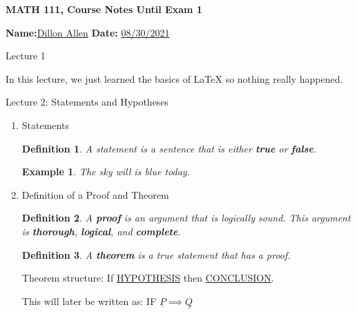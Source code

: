 \documentclass[11pt]{amsart}
\newtheorem{definition}{Definition}
\newtheorem{example}{Example}
\begin{document}
\begin{center}
\textbf{MATH 111, Course Notes Until Exam 1}%
\end{center}

\vspace{.3 in}

\textbf{Name:}\underline{Dillon Allen} \hspace{1in} \textbf{Date:} \underline{08/30/2021}%

\vspace{.3in}



\begin{section}{Lecture 1}

In this lecture, we just learned the basics of LaTeX so nothing really happened.

\end{section}

\begin{section}{Lecture 2: Statements and Hypotheses}

\begin{enumerate}
	\item Statements 
	\begin{definition} 
	A statement is a sentence that is either \textbf{true} or \textbf{false}.
	\end{definition}
	
	\begin{example}
		The sky will is blue today.
	\end{example}
	
	\item Definition of a Proof and Theorem
	
	\begin{definition}
		A \textbf{proof} is an argument that is logically sound. This argument is  \textbf{thorough}, \textbf{logical}, and \textbf{complete}.
	\end{definition}
	
	\begin{definition}
		A \textbf{theorem} is a true statement that has a proof.
	\end{definition}
	
Theorem structure: If \underline{HYPOTHESIS} then \underline{CONCLUSION}.
	
This will later be written as: IF $ \underline{P} \implies \underline{Q}$ 
	
\end{enumerate}
	
\end{section}
\end{document}
